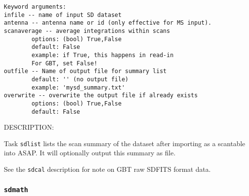 \begin{verbatim}
Keyword arguments:
infile -- name of input SD dataset
antenna -- antenna name or id (only effective for MS input). 
scanaverage -- average integrations within scans
        options: (bool) True,False
        default: False
        example: if True, this happens in read-in
        For GBT, set False!
outfile -- Name of output file for summary list
        default: '' (no output file)
        example: 'mysd_summary.txt'
overwrite -- overwrite the output file if already exists
        options: (bool) True,False
        default: False
\end{verbatim}
    
DESCRIPTION:
    
Task {\tt sdlist} lists the scan summary of the dataset after importing
as a scantable into ASAP.  It will optionally output this summary
as file.
    

See the {\tt sdcal} description for note on GBT raw SDFITS format data.

\subsubsection{{\tt sdmath}}
\label{section:sd.sdtasks.tasks.sdmath}

